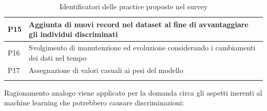 \begin{itemize}
\begin{longtable}{| p{} | p{} |}
        \\ \hline
        \rowcolor{Gray!30}
        P15 & Aggiunta di nuovi record nel dataset al fine di avvantaggiare gli individui discriminati
        \\ \hline
        P16 & Svolgimento di manutenzione ed evoluzione considerando i cambiamenti dei dati nel tempo
        \\ \hline
        \rowcolor{Gray!30}
        P17 & Assegnazione di valori casuali ai pesi del modello
         \\ \hline
        \caption{Identificatori delle practice proposte nel survey} %
        \label{table-root-id-2}
    \end{longtable}
\end{itemize}

Ragionamento analogo viene applicato per la domanda circa gli aspetti inerenti al machine learning che potrebbero causare discriminazioni:


